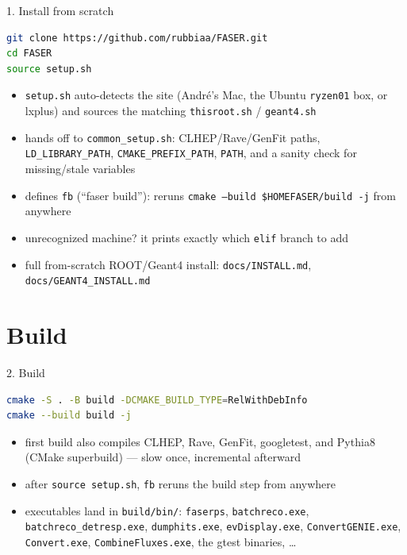 \documentclass[aspectratio=169]{beamer}
\begin{document}
\begin{frame}[fragile]{1. Install from scratch}
\begin{lstlisting}[language=bash]
git clone https://github.com/rubbiaa/FASER.git
cd FASER
source setup.sh
\end{lstlisting}
  \begin{itemize}
    \item \texttt{setup.sh} auto-detects the site (Andr\'e's Mac, the Ubuntu
      \texttt{ryzen01} box, or lxplus) and sources the matching
      \texttt{thisroot.sh} / \texttt{geant4.sh}
    \item hands off to \texttt{common\_setup.sh}: CLHEP/Rave/GenFit paths,
      \texttt{LD\_LIBRARY\_PATH}, \texttt{CMAKE\_PREFIX\_PATH}, \texttt{PATH},
      and a sanity check for missing/stale variables
    \item defines \texttt{fb} (``faser build''): reruns
      \texttt{cmake --build \$HOMEFASER/build -j} from anywhere
    \item unrecognized machine? it prints exactly which \texttt{elif} branch
      to add
    \item full from-scratch ROOT/Geant4 install: \texttt{docs/INSTALL.md},
      \texttt{docs/GEANT4\_INSTALL.md}
  \end{itemize}
\end{frame}

\section{Build}

\begin{frame}[fragile]{2. Build}
\begin{lstlisting}[language=bash]
cmake -S . -B build -DCMAKE_BUILD_TYPE=RelWithDebInfo
cmake --build build -j
\end{lstlisting}
  \begin{itemize}
    \item first build also compiles CLHEP, Rave, GenFit, googletest, and
      Pythia8 (CMake superbuild) --- slow once, incremental afterward
    \item after \texttt{source setup.sh}, \texttt{fb} reruns the build step
      from anywhere
    \item executables land in \texttt{build/bin/}: \texttt{faserps},
      \texttt{batchreco.exe}, \texttt{batchreco\_detresp.exe},
      \texttt{dumphits.exe}, \texttt{evDisplay.exe},
      \texttt{ConvertGENIE.exe}, \texttt{Convert.exe},
      \texttt{CombineFluxes.exe}, the gtest binaries, \ldots
  \end{itemize}
\end{frame}
\end{document}
